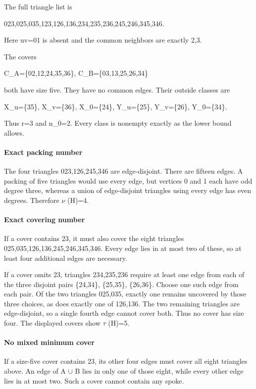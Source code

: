 \documentclass[11pt]{article}
\begin{document}
The full triangle list is

023,025,035,123,126,136,234,235,236,245,246,345,346.

Here uv=01 is absent and the common neighbors are exactly 2,3.

The covers

C\_A=\{02,12,24,35,36\}, C\_B=\{03,13,25,26,34\}

both have size five. They have no common edges. Their outside classes are

X\_u=\{35\}, X\_v=\{36\}, X\_0=\{24\}, Y\_u=\{25\}, Y\_v=\{26\}, Y\_0=\{34\}.

Thus r=3 and n\_0=2. Every class is nonempty exactly as the lower bound allows.

\paragraph{Exact packing number}\label{exact-packing-number}

The four triangles 023,126,245,346 are edge-disjoint. There are fifteen edges. A packing of five triangles would use every edge, but vertices 0 and 1 each have odd degree three, whereas a union of edge-disjoint triangles using every edge has even degrees. Therefore \(\nu\) (H)=4.

\paragraph{Exact covering number}\label{exact-covering-number}

If a cover contains 23, it must also cover the eight triangles 025,035,126,136,245,246,345,346. Every edge lies in at most two of these, so at least four additional edges are necessary.

If a cover omits 23, triangles 234,235,236 require at least one edge from each of the three disjoint pairs \{24,34\}, \{25,35\}, \{26,36\}. Choose one such edge from each pair. Of the two triangles 025,035, exactly one remains uncovered by those three choices, as does exactly one of 126,136. The two remaining triangles are edge-disjoint, so a single fourth edge cannot cover both. Thus no cover has size four. The displayed covers show \(\tau\) (H)=5.

\paragraph{No mixed minimum cover}\label{no-mixed-minimum-cover}

If a size-five cover contains 23, its other four edges must cover all eight triangles above. An edge of A \(\cup\) B lies in only one of those eight, while every other edge lies in at most two. Such a cover cannot contain any spoke.
\end{document}
